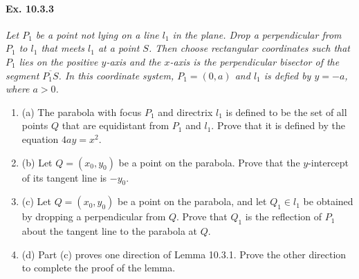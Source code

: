 \documentclass[11pt,a4paper]{article}
\newcommand{\be} {\begin{enumerate}}
\newcommand{\ee} {\end{enumerate}}
\begin{document}
\paragraph{Ex. 10.3.3}

{\it Let $P_1$ be a point not lying on a line $l_1$ in the plane. Drop a perpendicular from $P_1$ to $l_1$ that meets $l_1$ at a point $S$. Then choose rectangular coordinates such that $P_1$ lies on the positive $y$-axis and the $x$-axis is the perpendicular bisector of the segment $\overline{P_1S}$. In this coordinate system, $P_1=(0,a)$ and $l_1$ is defied by $y=-a$, where $a>0$.
\be
\item[(a)] The parabola with focus $P_1$ and directrix $l_1$ is defined to be the set of all points $Q$ that are equidistant from $P_1$ and $l_1$. Prove that it is defined by the equation $4ay = x^2$.

\item[(b)] Let $Q = (x_0,y_0)$ be a point on the parabola. Prove that the $y$-intercept of its tangent line is $-y_0$.

\item[(c)] Let $Q = (x_0,y_0)$ be a point on the parabola, and let $Q_1 \in l_1$ be obtained by dropping a perpendicular from $Q$. Prove that $Q_1$ is the reflection of $P_1$ about the tangent line to the parabola at $Q$.

\item[(d)] Part (c) proves one direction of Lemma 10.3.1. Prove the other direction to complete the proof of the lemma.
\ee
}
\end{document}
